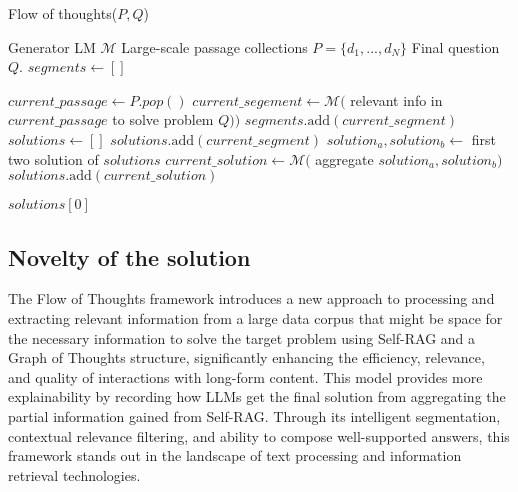\documentclass{article}
\begin{document}
\begin{algorithm}
    \caption{Flow of thoughts($P,Q$)}\label{alg:cap}
    \begin{algorithmic}
        \Require Generator LM $\mathcal{M}$
        \Require Large-scale passage collections $P=\{d_1, . . . , d_N \}$
        \Require Final question $Q$.
         \State $segments \gets []$
        
                    \State $current\_passage\gets P.pop()$
                    \State $current\_segement\gets \mathcal{M}($ relevant info in $current\_passage$ to solve problem $Q))$
                    \State $segments.\text{add}(current\_segment)$
                \EndIf
                \EndWhile
        \State $solutions\gets[]$
            \State $solutions.\text{add}(current\_segment)$
        \EndFor
            \State $solution_a,solution_b\gets$ first two solution of $solutions$
            \State $current\_solution\gets\mathcal{M}($ aggregate $solution_a,solution_b)$ 
            \State $solutions.\text{add}(current\_solution)$
        \EndWhile

        \State \Return $solutions[0]$

        
    \end{algorithmic}
    \end{algorithm}


\subsection{Novelty of the solution}

The Flow of Thoughts framework introduces a new approach to processing and extracting relevant information from a large data corpus that might be space for the necessary information to solve the target problem using Self-RAG and a Graph of Thoughts structure, significantly enhancing the efficiency, relevance, and quality of interactions with long-form content. This model provides more explainability by recording how LLMs get the final solution from aggregating the partial information gained from Self-RAG. Through its intelligent segmentation, contextual relevance filtering, and ability to compose well-supported answers, this framework stands out in the landscape of text processing and information retrieval technologies.
\end{document}
